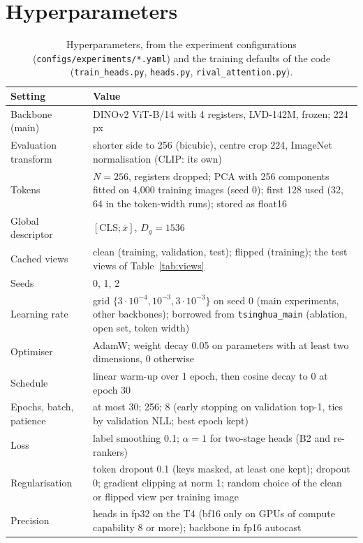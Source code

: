 \documentclass[11pt,a4paper]{article}
\theoremstyle{plain}
\begin{document}
\section{Hyperparameters}\label{app:hyper}
\begin{table}[!htbp]
\centering
\caption{Hyperparameters, from the experiment configurations (\texttt{configs/experiments/*.yaml}) and the training
defaults of the code (\texttt{train\_heads.py}, \texttt{heads.py}, \texttt{rival\_attention.py}).}
\label{tab:hyper}
\small
\begin{tabularx}{\textwidth}{@{}L{3.6cm}Y@{}}
\toprule
Setting & Value\\
\midrule
Backbone (main) & DINOv2 ViT-B/14 with 4 registers, LVD-142M, frozen; 224\,px\\
Evaluation transform & shorter side to 256 (bicubic), centre crop 224, ImageNet normalisation (CLIP: its own)\\
Tokens & $N=256$, registers dropped; PCA with 256 components fitted on 4,000 training images (seed 0); first 128
used (32, 64 in the token-width runs); stored as float16\\
Global descriptor & $[\mathrm{CLS};\bar x]$, $D_g=1536$\\
Cached views & clean (training, validation, test); flipped (training); the test views of Table~\ref{tab:views}\\
Seeds & 0, 1, 2\\
Learning rate & grid $\{3\cdot10^{-4},10^{-3},3\cdot10^{-3}\}$ on seed 0 (main experiments, other backbones);
borrowed from \texttt{tsinghua\_main} (ablation, open set, token width)\\
Optimiser & AdamW; weight decay 0.05 on parameters with at least two dimensions, 0 otherwise\\
Schedule & linear warm-up over 1 epoch, then cosine decay to 0 at epoch 30\\
Epochs, batch, patience & at most 30; 256; 8 (early stopping on validation top-1, ties by validation NLL; best epoch
kept)\\
Loss & label smoothing 0.1; $\alpha=1$ for two-stage heads (B2 and re-rankers)\\
Regularisation & token dropout 0.1 (keys masked, at least one kept); dropout 0; gradient clipping at norm 1; random
choice of the clean or flipped view per training image\\
Precision & heads in fp32 on the T4 (bf16 only on GPUs of compute capability 8 or more); backbone in fp16 autocast\\

\end{tabularx}
\end{table}
\end{document}
